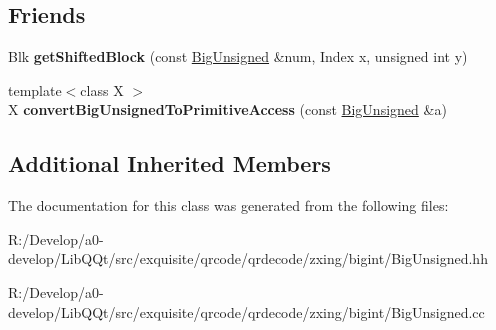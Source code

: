 \subsection*{Friends}
\begin{DoxyCompactItemize}
\item 
\mbox{\label{class_big_unsigned_a071e047bb0c201c2efe2867378a03a2c}} 
Blk {\bfseries get\+Shifted\+Block} (const \mbox{\hyperlink{class_big_unsigned}{Big\+Unsigned}} \&num, Index x, unsigned int y)
\item 
\mbox{\label{class_big_unsigned_a96741d68d18c9847cc65eeb8761d7497}} 
{\footnotesize template$<$class X $>$ }\\X {\bfseries convert\+Big\+Unsigned\+To\+Primitive\+Access} (const \mbox{\hyperlink{class_big_unsigned}{Big\+Unsigned}} \&a)
\end{DoxyCompactItemize}
\subsection*{Additional Inherited Members}


The documentation for this class was generated from the following files\+:\begin{DoxyCompactItemize}
\item 
R\+:/\+Develop/a0-\/develop/\+Lib\+Q\+Qt/src/exquisite/qrcode/qrdecode/zxing/bigint/Big\+Unsigned.\+hh\item 
R\+:/\+Develop/a0-\/develop/\+Lib\+Q\+Qt/src/exquisite/qrcode/qrdecode/zxing/bigint/Big\+Unsigned.\+cc\end{DoxyCompactItemize}

